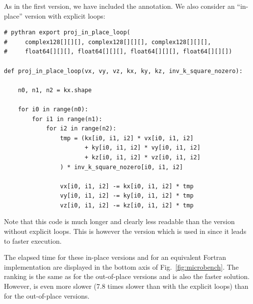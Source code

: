 \documentclass{../jors}
\begin{document}
As in the first version, we have included the  annotation.
%
We also consider an ``in-place'' version with explicit loops:
\begin{verbatim}
# pythran export proj_in_place_loop(
#     complex128[][][], complex128[][][], complex128[][][],
#     float64[][][], float64[][][], float64[][][], float64[][][])

def proj_in_place_loop(vx, vy, vz, kx, ky, kz, inv_k_square_nozero):

    n0, n1, n2 = kx.shape

    for i0 in range(n0):
        for i1 in range(n1):
            for i2 in range(n2):
                tmp = (kx[i0, i1, i2] * vx[i0, i1, i2]
                       + ky[i0, i1, i2] * vy[i0, i1, i2]
                       + kz[i0, i1, i2] * vz[i0, i1, i2]
                ) * inv_k_square_nozero[i0, i1, i2]

                vx[i0, i1, i2] -= kx[i0, i1, i2] * tmp
                vy[i0, i1, i2] -= ky[i0, i1, i2] * tmp
                vz[i0, i1, i2] -= kz[i0, i1, i2] * tmp

\end{verbatim}
Note that this code is much longer and clearly less readable than the version
without explicit loops.  This is however the version which is used in
 since it leads to faster execution.

The elapsed time for these in-place versions and for an equivalent Fortran
implementation are displayed in the bottom axis of Fig.~\ref{fig:microbench}.
%
The ranking is the same as for the out-of-place versions and  is also
the faster solution.
%
However,  is even more slower (7.8 times slower than 
with the explicit loops) than for the out-of-place versions.
\end{document}

